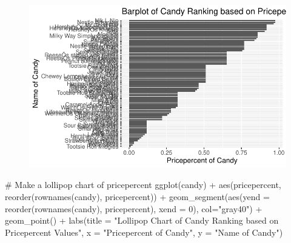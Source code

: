 \documentclass[
  letterpaper,
  DIV=11,
  numbers=noendperiod]{scrartcl}
\newenvironment{Shaded}{\begin{snugshade}}{\end{snugshade}}
\newcommand{\AttributeTok}[1]{\textcolor[rgb]{0.40,0.45,0.13}{#1}}
\newcommand{\CommentTok}[1]{\textcolor[rgb]{0.37,0.37,0.37}{#1}}
\newcommand{\DecValTok}[1]{\textcolor[rgb]{0.68,0.00,0.00}{#1}}
\newcommand{\FunctionTok}[1]{\textcolor[rgb]{0.28,0.35,0.67}{#1}}
\newcommand{\NormalTok}[1]{\textcolor[rgb]{0.00,0.23,0.31}{#1}}
\newcommand{\SpecialCharTok}[1]{\textcolor[rgb]{0.37,0.37,0.37}{#1}}
\newcommand{\StringTok}[1]{\textcolor[rgb]{0.13,0.47,0.30}{#1}}
\begin{document}
\begin{figure}[H]

{\centering \includegraphics{class10_files/figure-pdf/unnamed-chunk-24-1.pdf}

}

\end{figure}

\begin{Shaded}
\begin{Highlighting}[]
\CommentTok{\# Make a lollipop chart of pricepercent}
\FunctionTok{ggplot}\NormalTok{(candy) }\SpecialCharTok{+}
  \FunctionTok{aes}\NormalTok{(pricepercent, }\FunctionTok{reorder}\NormalTok{(}\FunctionTok{rownames}\NormalTok{(candy), pricepercent)) }\SpecialCharTok{+}
  \FunctionTok{geom\_segment}\NormalTok{(}\FunctionTok{aes}\NormalTok{(}\AttributeTok{yend =} \FunctionTok{reorder}\NormalTok{(}\FunctionTok{rownames}\NormalTok{(candy), pricepercent), }
                   \AttributeTok{xend =} \DecValTok{0}\NormalTok{), }\AttributeTok{col=}\StringTok{"gray40"}\NormalTok{) }\SpecialCharTok{+}
  \FunctionTok{geom\_point}\NormalTok{() }\SpecialCharTok{+}
  \FunctionTok{labs}\NormalTok{(}\AttributeTok{title =} \StringTok{"Lollipop Chart of Candy Ranking based on Pricepercent Values"}\NormalTok{, }
       \AttributeTok{x =} \StringTok{"Pricepercent of Candy"}\NormalTok{, }\AttributeTok{y =} \StringTok{"Name of Candy"}\NormalTok{)}
\end{Highlighting}
\end{Shaded}
\end{document}
